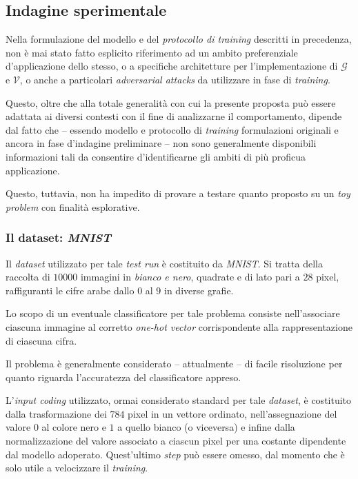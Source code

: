 \documentclass[a4paper, twoside]{article}
\begin{document}
\subsection{Indagine sperimentale}

Nella formulazione del modello e del \textit{protocollo di training} descritti in precedenza, non è mai stato fatto esplicito riferimento ad un ambito preferenziale d'applicazione dello stesso, o a specifiche architetture per l'implementazione di $\mathcal{G}$ e $\mathcal{V}$, o anche a particolari \textit{adversarial attacks} da utilizzare in fase di \textit{training}.

Questo, oltre che alla totale generalità con cui la presente proposta può essere adattata ai diversi contesti con il fine di analizzarne il comportamento, dipende dal fatto che -- essendo modello e protocollo di \textit{training} formulazioni originali e ancora in fase d'indagine preliminare -- non sono generalmente disponibili informazioni tali da consentire d'identificarne gli ambiti di più proficua applicazione.

Questo, tuttavia, non ha impedito di provare a testare quanto proposto su un \textit{toy problem} con finalità esplorative.

\subsubsection{Il dataset: \textit{MNIST}}

Il \textit{dataset} utilizzato per tale \textit{test run} è costituito da \textit{MNIST}. Si tratta della raccolta di $10000$ immagini in \textit{bianco e nero}, quadrate e di lato pari a $28$ pixel, raffiguranti le cifre arabe dallo $0$ al $9$ in diverse grafie.

Lo scopo di un eventuale classificatore per tale problema consiste nell'associare ciascuna immagine al corretto \textit{one-hot vector} corrispondente alla rappresentazione di ciascuna cifra.

Il problema è generalmente considerato -- attualmente -- di facile risoluzione per quanto riguarda l'accuratezza del classificatore appreso.

L'\textit{input coding} utilizzato, ormai considerato standard per tale \textit{dataset}, è costituito dalla trasformazione dei $784$ pixel in un vettore ordinato, nell'assegnazione del valore $0$ al colore nero e $1$ a quello bianco (o viceversa) e infine dalla normalizzazione del valore associato a ciascun pixel per una costante dipendente dal modello adoperato. Quest'ultimo \textit{step} può essere omesso, dal momento che è solo utile a velocizzare il \textit{training}.
\end{document}
